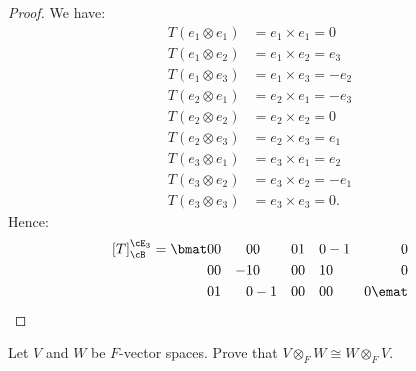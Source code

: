 \documentclass[10pt,twoside,openany]{memoir}
\begin{document}
        \begin{proof}
            We have:
                \begin{equation*}
                \begin{split}
                    T(e_1 \otimes e_1) &=e_1 \times e_1 = 0 \\
                    T(e_1 \otimes e_2) &=e_1 \times e_2 = e_3\\
                    T(e_1 \otimes e_3) &=e_1 \times e_3 = -e_2\\
                    T(e_2 \otimes e_1) &=e_2 \times e_1 = -e_3\\
                    T(e_2 \otimes e_2) &=e_2 \times e_2 = 0 \\
                    T(e_2 \otimes e_3) &=e_2 \times e_3  =e_1\\
                    T(e_3 \otimes e_1) &=e_3 \times e_1 = e_2\\
                    T(e_3 \otimes e_2) &=e_3 \times e_2  = -e_1\\
                    T(e_3 \otimes e_3) &=e_3 \times e_3 = 0.
                \end{split}
                \end{equation*}
            Hence:
                \begin{equation*}
                \begin{split}
                    \left[T\right]_\cB^{\cE_3}=
                    \bmat
                    0 &  0  &  0   &  0   &  0     &   1   &  0   &  -1 &  0\\
                    0 &  0  &  -1  &  0   &   0    &   0   &  1   &  0  &  0 \\
                    0 &  1  &  0   &  -1  &   0    &   0   &  0   &  0  &  0
                    \emat
                \end{split}
                \end{equation*}
        \end{proof}
    \begin{exercise}
        Let $V$ and $W$ be $F$-vector spaces. Prove that $V \otimes_F W \cong W \otimes_F V$.
    \end{exercise}
\end{document}
